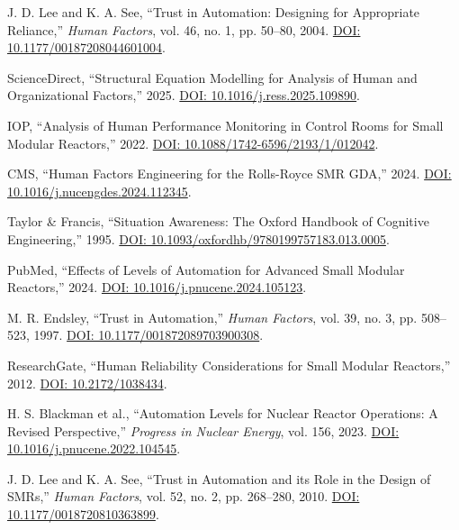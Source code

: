 \documentclass[conference]{IEEEtran}
\begin{document}
\begin{table}[t]
\begin{thebibliography}{54}
J. D. Lee and K. A. See, ``Trust in Automation: Designing for Appropriate Reliance,'' \emph{Human Factors}, vol. 46, no. 1, pp. 50--80, 2004. \href{https://doi.org/10.1177/00187208044601004}{DOI: 10.1177/00187208044601004}.

ScienceDirect, ``Structural Equation Modelling for Analysis of Human and Organizational Factors,'' 2025. \href{https://doi.org/10.1016/j.ress.2025.109890}{DOI: 10.1016/j.ress.2025.109890}.

IOP, ``Analysis of Human Performance Monitoring in Control Rooms for Small Modular Reactors,'' 2022. \href{https://doi.org/10.1088/1742-6596/2193/1/012042}{DOI: 10.1088/1742-6596/2193/1/012042}.

CMS, ``Human Factors Engineering for the Rolls-Royce SMR GDA,'' 2024. \href{https://doi.org/10.1016/j.nucengdes.2024.112345}{DOI: 10.1016/j.nucengdes.2024.112345}.

Taylor & Francis, ``Situation Awareness: The Oxford Handbook of Cognitive Engineering,'' 1995. \href{https://doi.org/10.1093/oxfordhb/9780199757183.013.0005}{DOI: 10.1093/oxfordhb/9780199757183.013.0005}.

PubMed, ``Effects of Levels of Automation for Advanced Small Modular Reactors,'' 2024. \href{https://doi.org/10.1016/j.pnucene.2024.105123}{DOI: 10.1016/j.pnucene.2024.105123}.

M. R. Endsley, ``Trust in Automation,'' \emph{Human Factors}, vol. 39, no. 3, pp. 508--523, 1997. \href{https://doi.org/10.1177/001872089703900308}{DOI: 10.1177/001872089703900308}.

ResearchGate, ``Human Reliability Considerations for Small Modular Reactors,'' 2012. \href{https://doi.org/10.2172/1038434}{DOI: 10.2172/1038434}.

H. S. Blackman et al., ``Automation Levels for Nuclear Reactor Operations: A Revised Perspective,'' \emph{Progress in Nuclear Energy}, vol. 156, 2023. \href{https://doi.org/10.1016/j.pnucene.2022.104545}{DOI: 10.1016/j.pnucene.2022.104545}.

J. D. Lee and K. A. See, ``Trust in Automation and its Role in the Design of SMRs,'' \emph{Human Factors}, vol. 52, no. 2, pp. 268--280, 2010. \href{https://doi.org/10.1177/0018720810363899}{DOI: 10.1177/0018720810363899}.


\end{thebibliography}
\end{table}
\end{document}
